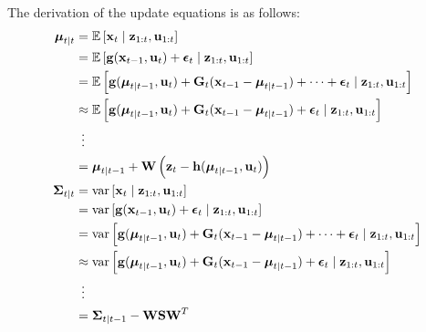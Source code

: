 The derivation of the update equations is as follows:
\begin{align}
	\vec \mu_{t \mid t}	&= \E\left[\vec x_t \mid \vec z_{1:t}, \vec u_{1:t}\right] \\
						&= \E\left[\vec g(\vec x_{t - 1}, \vec u_t) + \vec \epsilon_t \mid \vec z_{1:t}, \vec u_{1:t}\right] \\
						&= \E\left[\vec g(\vec \mu_{t \mid t - 1}, \vec u_t) + \vec G_t (\vec x_{t - 1} - \vec \mu_{t \mid t - 1}) + \cdots + \vec \epsilon_t \mid \vec z_{1:t}, \vec u_{1:t}\right] \\
						&\approx \E\left[\vec g(\vec \mu_{t \mid t - 1}, \vec u_t) + \vec G_t (\vec x_{t - 1} - \vec \mu_{t \mid t - 1}) + \vec \epsilon_t \mid \vec z_{1:t}, \vec u_{1:t}\right] \\
						&\,\,\,\vdots \\
						&= \vec \mu_{t \mid t - 1} + \vec W \left(\vec z_t - \vec h(\vec \mu_{t \mid t - 1}, \vec u_t)\right) \\
	\vec \Sigma_{t \mid t}	&= \var\left[\vec x_t \mid \vec z_{1:t}, \vec u_{1:t}\right] \\
							&= \var\left[\vec g(\vec x_{t - 1}, \vec u_t) + \vec \epsilon_t \mid \vec z_{1:t}, \vec u_{1:t}\right] \\
							&= \var\left[\vec g(\vec \mu_{t \mid t - 1}, \vec u_t) + \vec G_t (\vec x_{t - 1} - \vec \mu_{t \mid t - 1}) + \cdots + \vec \epsilon_t \mid \vec z_{1:t}, \vec u_{1:t}\right] \\
							&\approx \var\left[\vec g(\vec \mu_{t \mid t - 1}, \vec u_t) + \vec G_t (\vec x_{t - 1} - \vec \mu_{t \mid t - 1}) + \vec \epsilon_t \mid \vec z_{1:t}, \vec u_{1:t}\right] \\
							&\,\,\,\vdots \\
							&= \vec \Sigma_{t \mid t - 1} - \vec W \vec S \vec W^T
\end{align}